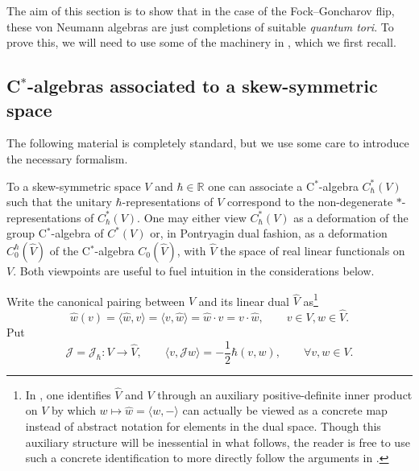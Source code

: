 \documentclass[11pt, reqno]{amsart}
\theoremstyle{definition}
\numberwithin{equation}{section}
\def\R{\mathbb R}
\newcommand{\Jc}{\mathcal{J}}
\begin{document}
The aim of this section is to show that in the case of the Fock--Goncharov flip, these von Neumann algebras are just completions of suitable \emph{quantum tori}.  To prove this, we will need to use some of the machinery in \cite{Rie93}, which we first recall. 

\subsection{\texorpdfstring{C$^*$-algebras}{C*-algebras} associated to a skew-symmetric space}\label{SecCStarRieff}

The following material is completely standard, but we use some care to introduce the necessary formalism. 

To a skew-symmetric space $V$ and $\hbar\in \R$ one can associate a C$^*$-algebra $C^*_{\hbar}(V)$ such that the unitary $\hbar$-representations of $V$ correspond to the non-degenerate $*$-representations of $C^*_{\hbar}(V)$. One may either view $C^*_{\hbar}(V)$ as a deformation of the group C$^*$-algebra of $C^*(V)$ or, in Pontryagin dual fashion, as a deformation $C_0^{\hbar}(\hat{V})$ of the C$^*$-algebra $C_0(\hat{V})$, with $\hat{V}$ the space of real linear functionals on $V$. Both viewpoints are useful to fuel intuition in the considerations below.

Write the canonical pairing between $V$ and its linear dual $\hat{V}$ as\footnote{In \cite{Rie93}, one identifies $\hat{V}$ and $V$ through an auxiliary positive-definite inner product on $V$ by which $w \mapsto \hat{w} = \langle w,-\rangle$ can actually be viewed as a concrete map instead of abstract notation for elements in the dual space. Though this auxiliary structure will be inessential in what follows, the reader is free to use such a concrete identification to more directly follow the arguments in \cite{Rie93}.} 
\[
\hat{w}(v) = \langle \hat{w},v\rangle = \langle v,\hat{w} \rangle = \hat{w} \cdot v = v\cdot \hat{w},\qquad v\in V, \hat{w} \in \hat{V}.
\] 
Put
\begin{equation}\label{EqJOperator}
\Jc = \Jc_{\hbar}\colon V \rightarrow \hat{V}, \qquad \langle v,\Jc w\rangle =   -\frac{1}{2}\hbar (v,w),\qquad \forall v,w\in V.
\end{equation}
\end{document}
